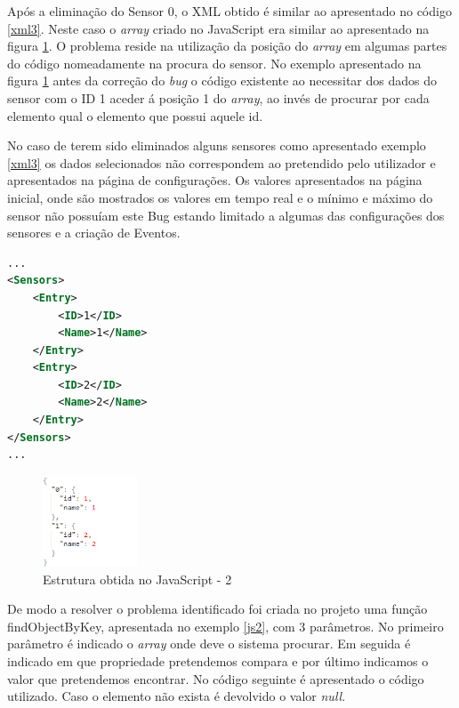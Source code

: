 \par Após a eliminação do Sensor 0, o XML obtido é similar ao apresentado no código \ref{xml3}. Neste caso o \textit{array} criado no JavaScript era similar ao apresentado na figura \ref{estruct2}. O problema reside na utilização da posição do \textit{array} em algumas partes do código nomeadamente na procura do sensor. No exemplo apresentado na figura \ref{estruct2} antes da correção do \textit{bug} o código existente ao necessitar dos dados do sensor com o ID 1 aceder á posição 1 do \textit{array}, ao invés de procurar por cada elemento qual o elemento que possui aquele id. 
\par No caso de terem sido eliminados alguns sensores como apresentado exemplo \ref{xml3} os dados selecionados não correspondem ao pretendido pelo utilizador e apresentados na página de configurações. Os valores apresentados na página inicial, onde são mostrados os valores em tempo real e o mínimo e máximo do sensor não possuíam este Bug estando limitado a algumas das configurações dos sensores e a criação de Eventos.

\begin{lstlisting}[caption=Exemplo do XML após eliminação do Sensor,label={xml3},language=XML]
...
<Sensors>
    <Entry>
        <ID>1</ID>
        <Name>1</Name>
    </Entry>
    <Entry>
        <ID>2</ID>
        <Name>2</Name>
    </Entry>
</Sensors>
...
\end{lstlisting}

\begin{figure}[ht]
\centering
\includegraphics[width=0.25\textwidth]{images/estruct2.png}
\caption{Estrutura obtida no JavaScript - 2}\label{estruct2}
\end{figure}


\par De modo a resolver o problema identificado foi criada no projeto uma função findObjectByKey, apresentada no exemplo \ref{js2}, com 3 parâmetros. No primeiro parâmetro é indicado o \textit{array} onde deve o sistema procurar. Em seguida é indicado em que propriedade pretendemos compara e por último indicamos o valor que pretendemos encontrar. No código seguinte é apresentado o código utilizado. Caso o elemento não exista é devolvido o valor \textit{null}.

